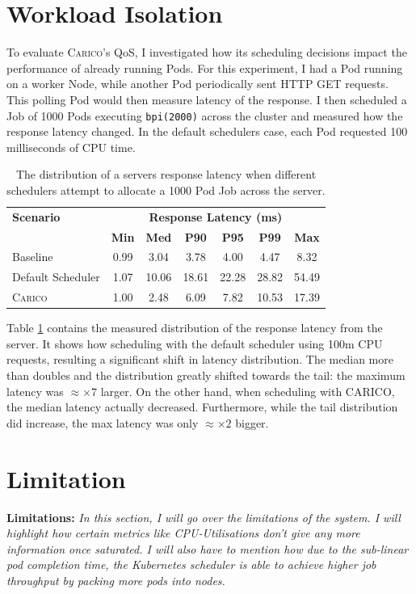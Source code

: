 \section{Workload Isolation}
\label{sec:workload-isolation}
To evaluate \textsc{Carico}'s QoS, I investigated how its scheduling decisions impact the
performance of already running Pods. For this experiment, I had a Pod running on
a worker Node, while another Pod periodically sent HTTP GET requests. This
polling Pod would then measure latency of the response. I then scheduled a Job
of 1000 Pods executing \texttt{bpi(2000)} across the cluster and measured how
the response latency changed. In the default schedulers case, each Pod requested
100 milliseconds of CPU time.

\begin{table}[h!]
\centering
    \begin{tabular}{|l|c|c|c|c|c|c|}
    \hline
    \textbf{Scenario} & \multicolumn{6}{c|}{\textbf{Response Latency (ms)}} \\
    \cline{2-7}
    & \textbf{Min} & \textbf{Med} & \textbf{P90} & \textbf{P95} & \textbf{P99} & \textbf{Max} \\
    \hline
    Baseline & 0.99 & 3.04 & 3.78 & 4.00 & 4.47 & 8.32 \\
    Default Scheduler & 1.07 & 10.06 & 18.61 & 22.28 & 28.82 & 54.49\\
    \textsc{Carico}  & 1.00 & 2.48 & 6.09 & 7.82 & 10.53 & 17.39\\
    \hline
    \end{tabular}
    \caption{The distribution of a servers response latency when different
    schedulers attempt to allocate a 1000 Pod Job across the server.}
    \label{tab:impacted-latency}
\end{table}

Table \ref{tab:impacted-latency} contains the measured distribution of the
response latency from the server. It shows how scheduling with the default
scheduler using 100m CPU requests, resulting a significant shift in latency
distribution. The median more than doubles and the distribution greatly shifted
towards the tail: the maximum latency was $\approx \times7$ larger. On the other
hand, when scheduling with CARICO, the median latency actually decreased.
Furthermore, while the tail distribution did increase, the max latency was only
$\approx \times2$ bigger.

\section{Limitation}
\begin{tcolorbox}[boxsep=0mm,left=2.5mm,right=2.5mm]
    \textbf{Limitations:} {\em In this section, I will go over the limitations
    of the system. I will highlight how certain metrics like CPU-Utilisations
    don't give any more information once saturated. I will also have to mention
    how due to the sub-linear pod completion time, the Kubernetes scheduler is
    able to achieve higher job throughput by packing more pods into nodes.
    }
\end{tcolorbox}

